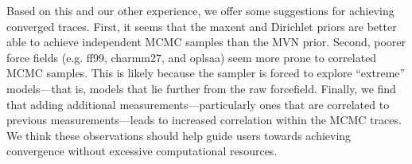 \documentclass[12pt]{article}
\begin{document}
Based on this and our other experience, we offer some suggestions for achieving converged traces.  First, it seems that the maxent and Dirichlet priors are better able to achieve independent MCMC samples than the MVN prior.  Second, poorer force fields (e.g. ff99, charmm27, and oplsaa) seem more prone to correlated MCMC samples.  This is likely because the sampler is forced to explore ``extreme'' models---that is, models that lie further from the raw forcefield.  Finally, we find that adding additional measurements---particularly ones that are correlated to previous measurements---leads to increased correlation within the MCMC traces.  We think these observations should help guide users towards achieving convergence without excessive computational resources.  

\newpage



\end{document}
